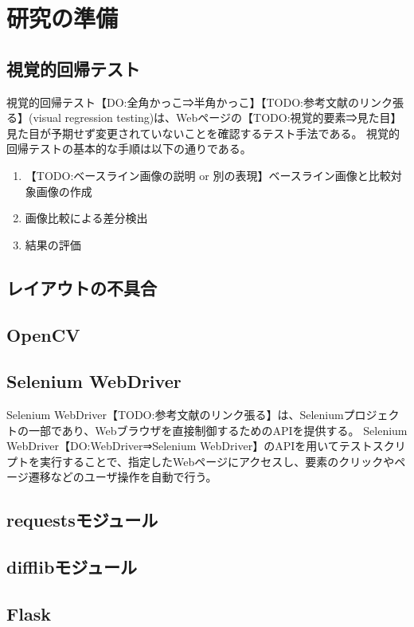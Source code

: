 \chapter{研究の準備}\label{cha:Preparation}

\section{視覚的回帰テスト}\label{sec:vrt}
視覚的回帰テスト【DO:全角かっこ⇒半角かっこ】【TODO:参考文献のリンク張る】(visual regression testing)は、Webページの【TODO:視覚的要素⇒見た目】見た目が予期せず変更されていないことを確認するテスト手法である。
視覚的回帰テストの基本的な手順は以下の通りである。
\begin{enumerate}
    \setlength{\itemsep}{0pt}
          \setlength{\parsep}{0pt}
    \item 【TODO:ベースライン画像の説明 or 別の表現】ベースライン画像と比較対象画像の作成
    \item 画像比較による差分検出
    \item 結果の評価
\end{enumerate}
\section{レイアウトの不具合}\label{sec:layout effect}

\section{OpenCV}\label{sec:OpenCV}

\section{Selenium WebDriver}\label{sec:Selenium_WebDriver}
Selenium WebDriver【TODO:参考文献のリンク張る】は、Seleniumプロジェクトの一部であり、Webブラウザを直接制御するためのAPIを提供する。
Selenium WebDriver【DO:WebDriver⇒Selenium WebDriver】のAPIを用いてテストスクリプトを実行することで、指定したWebページにアクセスし、要素のクリックやページ遷移などのユーザ操作を自動で行う。
\section{requestsモジュール}\label{sec:requests}

\section{difflibモジュール}\label{sec:difflib}

\section{Flask}\label{sec:Flask}